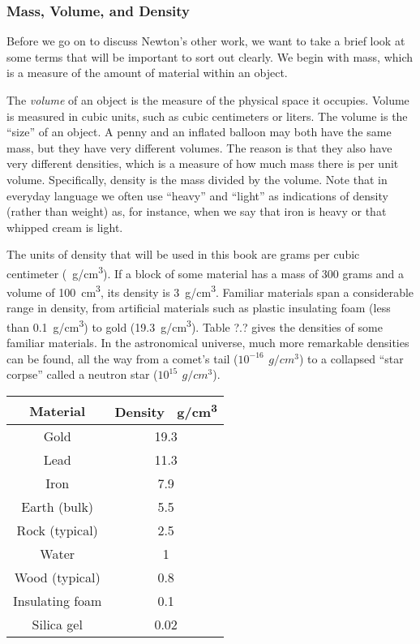 \documentclass[../../main-astronomy.tex]{subfiles}
\begin{document}
\subsubsection*{Mass, Volume, and Density}

Before we go on to discuss Newton’s other work, we want to take a brief look at some terms that will be important to sort out clearly. We begin with \gls{mass}, which is a measure of the amount of material within an object.

\vspace{1em}

The \textit{volume} of an object is the measure of the physical space it occupies. Volume is measured in cubic units, such as cubic centimeters or liters. The volume is the ``size'' of an object. A penny and an inflated balloon may both have the same mass, but they have very different volumes. The reason is that they also have very different densities, which is a measure of how much mass there is per unit volume. Specifically, \gls{density} is the mass divided by the volume. Note that in everyday language we often use ``heavy'' and ``light'' as indications of density (rather than weight) as, for instance, when we say that iron is heavy or that whipped cream is light.

\vspace{1em}

The units of density that will be used in this book are grams per cubic centimeter (\SI{}{g/cm^3}). If a block of some material has a mass of 300 grams and a volume of \SI{100}{cm^3}, its density is \SI{3}{g/cm^3}. Familiar materials span a considerable range in density, from artificial materials such as plastic insulating foam (less than \SI{0.1}{g/cm^3}) to gold (\SI{19.3}{g/cm^3}). Table ?.? gives the densities of some familiar materials. In the astronomical universe, much more remarkable densities can be found, all the way from a comet’s tail ($10^{-16}\,\SI{}{g/cm^3}$) to a collapsed ``star corpse'' called a neutron star ($10^{15}\,\SI{}{g/cm^3}$).

\begin{center}
    \begin{tabular}{|c|c|}
    \hline
        \textbf{Material} & \textbf{Density \SI{}{g/cm^3}} \\
        \hline
        Gold & 19.3\\
        Lead & 11.3\\
        Iron & 7.9\\
        Earth (bulk) & 5.5\\
        Rock (typical) & 2.5\\
        Water & 1\\
        Wood (typical) & 0.8\\
        Insulating foam & 0.1\\
        Silica gel & 0.02\\
        \hline
    \end{tabular}
    \captionsetup{type=table,margin=1in,font=scriptsize}
\end{center}
\end{document}
